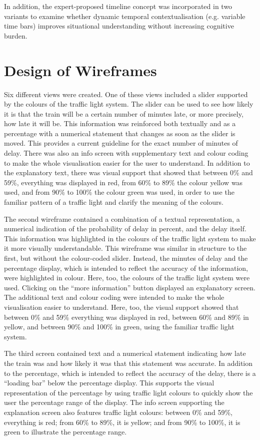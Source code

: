 \documentclass[final,journal,a4paper]{IEEEtran}
\begin{document}
In addition, the expert-proposed timeline concept was incorporated in two variants to examine whether dynamic temporal contextualisation (e.g. variable time bars) improves situational understanding without increasing cognitive burden.

\section{Design of Wireframes} \label{Design of Wireframes}
Six different views were created. One of these views included a slider supported by the colours of the traffic light system. The slider can be used to see how likely it is that the train will be a certain number of minutes late, or more precisely, how late it will be. This information was reinforced both textually and as a percentage with a numerical statement that changes as soon as the slider is moved. This provides a current guideline for the exact number of minutes of delay. There was also an info screen with supplementary text and colour coding to make the whole visualisation easier for the user to understand. In addition to the explanatory text, there was visual support that showed that between 0\% and 59\%, everything was displayed in red, from 60\% to 89\% the colour yellow was used, and from 90\% to 100\% the colour green was used, in order to use the familiar pattern of a traffic light and clarify the meaning of the colours.

The second wireframe contained a combination of a textual representation, a numerical indication of the probability of delay in percent, and the delay itself. This information was highlighted in the colours of the traffic light system to make it more visually understandable. This wireframe was similar in structure to the first, but without the colour-coded slider. Instead, the minutes of delay and the percentage display, which is intended to reflect the accuracy of the information, were highlighted in colour. Here, too, the colours of the traffic light system were used. Clicking on the ``more information'' button displayed an explanatory screen. The additional text and colour coding were intended to make the whole visualisation easier to understand. Here, too, the visual support showed that between 0\% and 59\% everything was displayed in red, between 60\% and 89\% in yellow, and between 90\% and 100\% in green, using the familiar traffic light system.

The third screen contained text and a numerical statement indicating how late the train was and how likely it was that this statement was accurate. In addition to the percentage, which is intended to reflect the accuracy of the delay, there is a “loading bar” below the percentage display. This supports the visual representation of the percentage by using traffic light colours to quickly show the user the percentage range of the display. The info screen supporting the explanation screen also features traffic light colours: between 0\% and 59\%, everything is red; from 60\% to 89\%, it is yellow; and from 90\% to 100\%, it is green to illustrate the percentage range.
\end{document}
